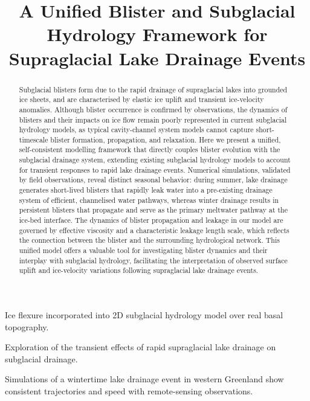 \documentclass[draft]{agujournal2019}
\begin{document}
\title{A Unified Blister and Subglacial Hydrology Framework for Supraglacial Lake Drainage Events}




\begin{keypoints}

\item Ice flexure incorporated into 2D subglacial hydrology model over real basal topography.

\item Exploration of the transient effects of rapid supraglacial lake drainage on subglacial drainage.

\item Simulations of a wintertime lake drainage event in western Greenland show consistent trajectories and speed with remote-sensing observations.

\end{keypoints}

\begin{abstract}
Subglacial blisters form due to the rapid drainage of supraglacial lakes into grounded ice sheets, and are characterised by elastic ice uplift and transient ice-velocity anomalies. Although blister occurrence is confirmed by observations, the dynamics of blisters and their impacts on ice flow remain poorly represented in current subglacial hydrology models, as typical cavity-channel system models cannot capture short-timescale blister formation, propagation, and relaxation. Here we present a unified, self-consistent modelling framework that directly couples blister evolution with the subglacial drainage system, extending existing subglacial hydrology models to account for transient responses to rapid lake drainage events. Numerical simulations, validated by field observations, reveal distinct seasonal behavior: during summer, lake drainage generates short-lived blisters that rapidly leak water into a pre-existing drainage system of efficient, channelised water pathways, whereas winter drainage results in persistent blisters that propagate and serve as the primary meltwater pathway at the ice-bed interface. The dynamics of blister propagation and leakage in our model are governed by effective viscosity and a characteristic leakage length scale, which reflects the connection between the blister and the surrounding hydrological network. This unified model offers a valuable tool for investigating blister dynamics and their interplay with subglacial hydrology, facilitating the interpretation of observed surface uplift and ice-velocity variations following supraglacial lake drainage events.
\end{abstract}
\end{document}
